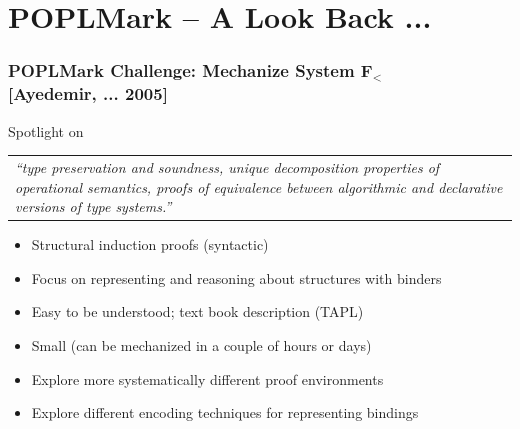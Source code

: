 \documentclass{beamer}
\begin{document}



  \section{POPLMark -- A Look Back ...}

\begin{frame}\frametitle{POPLMark Challenge: Mechanize System F$_<$ \\
{\small{[Ayedemir, ... 2005]}}}%


 Spotlight on

 \begin{center}\begin{tabular}{p{10cm}}
 {\small{\emph{``type preservation and soundness, unique decomposition properties of operational semantics, proofs of equivalence between algorithmic and declarative versions of type systems.''}}}
   \end{tabular}
 \end{center}
\begin{itemize}
\item Structural induction proofs (syntactic)
\item Focus on representing and reasoning about structures with binders
\item Easy to be understood; text book description (TAPL)
\item Small (can be mechanized in a couple of hours or days)
\item Explore more systematically different proof environments
\item Explore different encoding techniques for representing bindings
\end{itemize}

\end{frame}
\end{document}
